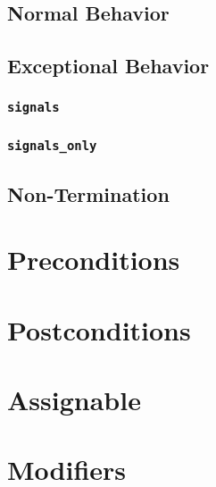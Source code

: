 \documentclass[a4paper, 11pt, accentcolor = tud3b]{tudreport}
\begin{document}
            \subsection{Normal Behavior} %

            \subsection{Exceptional Behavior} %

                \subsubsection{\texttt{signals}} %

                \subsubsection{\texttt{signals\_only} } %

            \subsection{Non-Termination} %

        \section{Preconditions} %

        \section{Postconditions} %

        \section{Assignable} %

        \section{Modifiers} %
\end{document}
